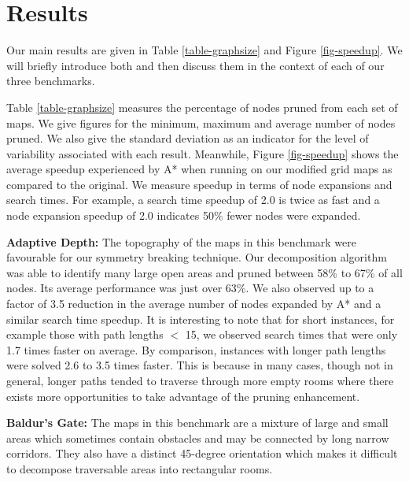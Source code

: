 \section{Results}
\label{sec-results}
Our main results are given in Table \ref{table-graphsize} and
Figure \ref{fig-speedup}.
We will briefly introduce both and then discuss them in the context
of each of our three benchmarks.
\par
Table \ref{table-graphsize} measures the percentage of nodes
pruned from each set of maps.  We give figures for the minimum,
maximum and average number of nodes pruned.  
We also give the standard deviation as an indicator
for the level of variability associated with each result. 
Meanwhile, Figure \ref{fig-speedup} shows the average speedup experienced
by A* when running on our modified grid maps as compared to the
original.  We measure speedup in terms of node expansions and search
times.  For example, a search time speedup of 2.0 is twice as fast and
a node expansion speedup of 2.0 indicates 50\% fewer nodes were expanded.

\textbf{Adaptive Depth:} 
The topography of the maps in this benchmark were favourable for
our symmetry breaking technique.  Our decomposition algorithm was
able to identify many large open areas and pruned between 58\%
to 67\% of all nodes.  Its average performance was just over
63\%.  We also observed up to a factor of 3.5 reduction in the average 
number of nodes expanded by A* and a similar search time speedup.
It is interesting to note that for short instances, for example
those with path lengths $<$ 15, we observed search times that were only 1.7
times faster on average. 
By comparison, instances with
longer path lengths were solved 2.6 to 3.5 times faster.  
This is because in many cases, though not in general, longer paths 
tended to traverse through more empty rooms where there exists more 
opportunities to take advantage of the pruning enhancement.
%
\par
\textbf{Baldur's Gate: }
The maps in this benchmark are a mixture of large and small areas
which sometimes contain obstacles and may be connected by long narrow 
corridors.
They also have a distinct 45-degree orientation which makes
it difficult to decompose traversable areas into rectangular rooms.
